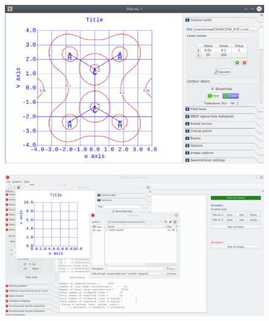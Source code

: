 \documentclass[a4paper,10pt]{article}
\begin{document}
\begin{minipage}{.5\linewidth}
\begin{figure}[H]
\caption{\label{fig:25}}
\begin{center}
\includegraphics[width=0.95\linewidth]{damqt_QS_fig25.png}
\end{center}
\end{figure} 
\end{minipage}
\begin{minipage}{.5\linewidth}
\begin{figure}[H]
\caption{\label{fig:26}}
\begin{center}
\includegraphics[width=0.95\linewidth]{damqt_QS_fig26.png}
\end{center}
\end{figure} 
\end{minipage}
\end{document}
